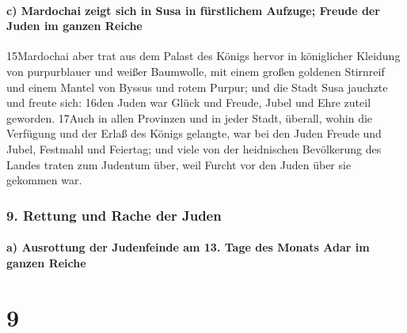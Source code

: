 \hypertarget{c-mardochai-zeigt-sich-in-susa-in-fuxfcrstlichem-aufzuge-freude-der-juden-im-ganzen-reiche}{%
\paragraph{c) Mardochai zeigt sich in Susa in fürstlichem Aufzuge;
Freude der Juden im ganzen
Reiche}\label{c-mardochai-zeigt-sich-in-susa-in-fuxfcrstlichem-aufzuge-freude-der-juden-im-ganzen-reiche}}

15Mardochai aber trat aus dem Palast des Königs hervor in königlicher
Kleidung von purpurblauer und weißer Baumwolle, mit einem großen
goldenen Stirnreif und einem Mantel von Byssus und rotem Purpur; und die
Stadt Susa jauchzte und freute sich: 16den Juden war Glück und Freude,
Jubel und Ehre zuteil geworden. 17Auch in allen Provinzen und in jeder
Stadt, überall, wohin die Verfügung und der Erlaß des Königs gelangte,
war bei den Juden Freude und Jubel, Festmahl und Feiertag; und viele von
der heidnischen Bevölkerung des Landes traten zum Judentum über, weil
Furcht vor den Juden über sie gekommen war.

\hypertarget{rettung-und-rache-der-juden}{%
\subsubsection{9. Rettung und Rache der
Juden}\label{rettung-und-rache-der-juden}}

\hypertarget{a-ausrottung-der-judenfeinde-am-13.-tage-des-monats-adar-im-ganzen-reiche}{%
\paragraph{a) Ausrottung der Judenfeinde am 13. Tage des Monats Adar im
ganzen
Reiche}\label{a-ausrottung-der-judenfeinde-am-13.-tage-des-monats-adar-im-ganzen-reiche}}

\hypertarget{section-8}{%
\section{9}\label{section-8}}

